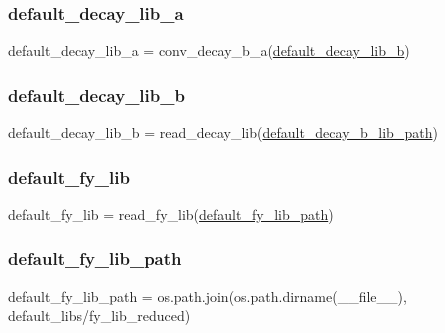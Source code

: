 \subsubsection{\texorpdfstring{default\+\_\+decay\+\_\+lib\+\_\+a}{default\_decay\_lib\_a}}
{\footnotesize\ttfamily default\+\_\+decay\+\_\+lib\+\_\+a = conv\+\_\+decay\+\_\+b\+\_\+a(\mbox{\hyperlink{namespaceopenbu_1_1data_a8ac39469c01ee20f8c8f591a7f819404}{default\+\_\+decay\+\_\+lib\+\_\+b}})}

\mbox{\label{namespaceopenbu_1_1data_a8ac39469c01ee20f8c8f591a7f819404}} 
\subsubsection{\texorpdfstring{default\+\_\+decay\+\_\+lib\+\_\+b}{default\_decay\_lib\_b}}
{\footnotesize\ttfamily default\+\_\+decay\+\_\+lib\+\_\+b = read\+\_\+decay\+\_\+lib(\mbox{\hyperlink{namespaceopenbu_1_1data_a9b3a8e8d7ebd312a43707bccbe007817}{default\+\_\+decay\+\_\+b\+\_\+lib\+\_\+path}})}

\mbox{\label{namespaceopenbu_1_1data_ab35924571b0d3e711972c1a0d8dd6fb8}} 
\subsubsection{\texorpdfstring{default\+\_\+fy\+\_\+lib}{default\_fy\_lib}}
{\footnotesize\ttfamily default\+\_\+fy\+\_\+lib = read\+\_\+fy\+\_\+lib(\mbox{\hyperlink{namespaceopenbu_1_1data_adbf88630dfc76644e89422a834a5d66d}{default\+\_\+fy\+\_\+lib\+\_\+path}})}

\mbox{\label{namespaceopenbu_1_1data_adbf88630dfc76644e89422a834a5d66d}} 
\subsubsection{\texorpdfstring{default\+\_\+fy\+\_\+lib\+\_\+path}{default\_fy\_lib\_path}}
{\footnotesize\ttfamily default\+\_\+fy\+\_\+lib\+\_\+path = os.\+path.\+join(os.\+path.\+dirname(\+\_\+\+\_\+file\+\_\+\+\_\+), \textquotesingle{}default\+\_\+libs/fy\+\_\+lib\+\_\+reduced\textquotesingle{})}

